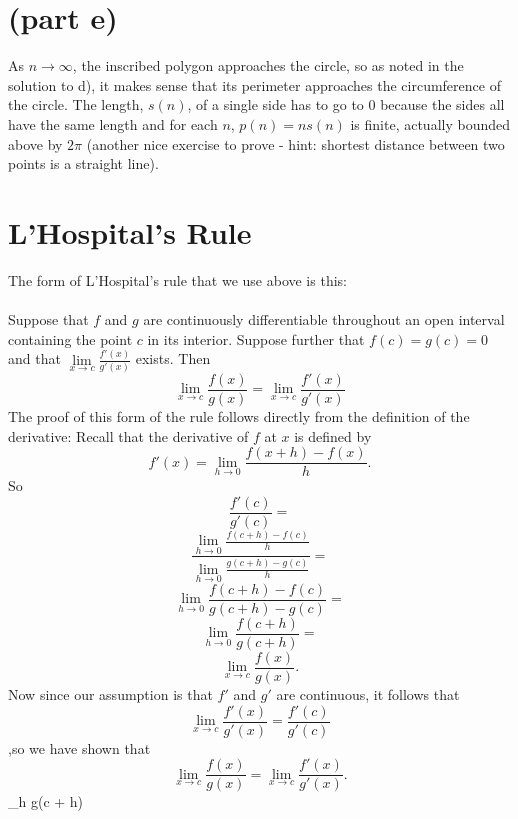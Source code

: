 \documentclass[11pt,a4paper]{report}
\theoremstyle{plain}
\theoremstyle{definition}
\theoremstyle{remark}
\begin{document}
\section*{(part e)}
As $n \to \infty$, the inscribed polygon approaches the circle, so as noted in the solution to d), it makes sense that its perimeter approaches the circumference of the circle.  The length, $s(n)$, of a single side has to go to $0$ because the sides all have the same length and for each $n$, $p(n) = ns(n)$ is finite, actually bounded above by $2\pi$ (another nice exercise to prove - hint: shortest distance between two points is a straight line).

\pagebreak
\section*{L'Hospital's Rule}
The form of L'Hospital's rule that we use above is this: \\\\
Suppose that $f$ and $g$ are continuously differentiable throughout an open interval containing the point $c$ in its interior.  Suppose further that $f(c) = g(c) = 0$ and that $\mathop{\lim}\limits_{x\to c}\frac{f'(x)}{g'(x)}$ exists.  Then 
$$\mathop{\lim}\limits_{x\to c}\frac{f(x)}{g(x)} = \mathop{\lim}\limits_{x\to c}\frac{f'(x)}{g'(x)}$$
The proof of this form of the rule follows directly from the definition of the derivative:
Recall that the derivative of $f$ at $x$ is defined by
$$f'(x) = \lim_{h \to 0} \frac{f(x + h) - f(x)}{h}.$$
So $$\frac{f'(c)}{g'(c)} = $$
$$\frac{\mathop{\lim}\limits_{h \to 0} \frac {f(c + h) - f(c)} {h}} {\mathop{\lim}\limits_{h \to 0} \frac {g(c + h) - g(c)} {h}} = $$
$$\lim_{h \to 0} \frac {f(c + h) - f(c)} {g(c + h) - g(c)} = $$
$$\lim_{h \to 0} \frac {f(c + h)} {g(c + h)} = $$
$$\lim_{x \to c} \frac {f(x)} {g(x)}.$$ 
Now since our assumption is that $f'$ and $g'$ are continuous, it follows that 
$$\mathop{\lim}\limits_{x\to c}\frac{f'(x)}{g'(x)} = \frac{f'(c)}{g'(c)}$$,so we have shown that 
$$\mathop{\lim}\limits_{x\to c}\frac{f(x)}{g(x)} = \mathop{\lim}\limits_{x\to c}\frac{f'(x)}{g'(x)}.$$$$\lim_{h }  {g(c + h)} 
\end{document}
